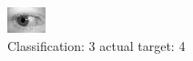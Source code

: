 \begin{figure}[h!]
\begin{center}
\includegraphics[width=0.60\columnwidth]{figures/ID765_class_3_target_4.png}
\end{center}
\caption{ Classification: 3 actual target: 4}
\label{fig:ID765_class_3_target_4}
\end{figure}
